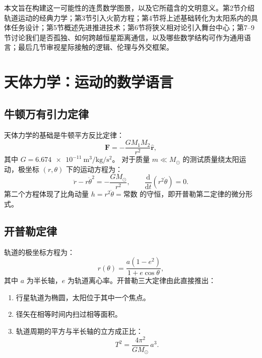 \documentclass[12pt,a4paper]{article}
\newcommand{\dd}{\mathrm{d}}
\begin{document}
本文旨在构建这一可能性的连贯数学图景，以及它所蕴含的文明意义。第2节介绍轨道运动的经典力学；第3节引入火箭方程；第4节将上述基础转化为太阳系内的具体任务设计；第5节概述先进推进技术；第6节将狭义相对论引入舞台中心；第7--9节讨论我们是否孤独、如何跨越恒星距离通信，以及哪些数学结构可作为通用语言；最后几节审视星际接触的逻辑、伦理与外交框架。

\section{天体力学：运动的数学语言}

\subsection{牛顿万有引力定律}

天体力学的基础是牛顿平方反比定律：
\begin{equation}
  \bm{F} = -\frac{GM_1 M_2}{r^2}\hat{\bm{r}},
\end{equation}
其中 $G = \SI{6.674e-11}{\meter\cubed\per\kilo\gram\per\second\squared}$。
对于质量 $m \ll M_\odot$ 的测试质量绕太阳运动，极坐标 $(r,\theta)$ 下的运动方程为：
\begin{equation}
  \ddot{r} - r\dot{\theta}^2 = -\frac{GM_\odot}{r^2}, \qquad
  \frac{\dd}{\dd t}(r^2\dot{\theta}) = 0.
\end{equation}
第二个方程体现了比角动量 $h = r^2\dot{\theta} = \text{常数}$ 的守恒，即开普勒第二定律的微分形式。

\subsection{开普勒定律}

轨道的极坐标方程为：
\begin{equation}
  r(\theta) = \frac{a(1-e^2)}{1 + e\cos\theta},
\end{equation}
其中 $a$ 为半长轴，$e$ 为轨道离心率。开普勒三大定律由此直接推出：
\begin{enumerate}[label=\textbf{K\arabic*.}]
  \item 行星轨道为椭圆，太阳位于其中一个焦点。
  \item 径矢在相等时间内扫过相等面积。
  \item 轨道周期的平方与半长轴的立方成正比：
    \begin{equation}
      T^2 = \frac{4\pi^2}{GM_\odot}\,a^3.
    \end{equation}
\end{enumerate}
\end{document}
